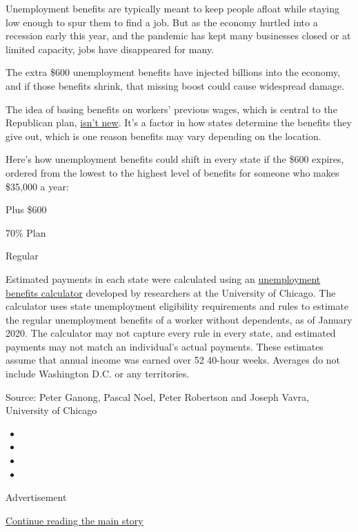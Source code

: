 Unemployment benefits are typically meant to keep people afloat while
staying low enough to spur them to find a job. But as the economy
hurtled into a recession early this year, and the pandemic has kept many
businesses closed or at limited capacity, jobs have disappeared for
many.

The extra \$600 unemployment benefits have injected billions into the
economy, and if those benefits shrink, that missing boost could cause
widespread damage.

The idea of basing benefits on workers' previous wages, which is central
to the Republican plan,
\href{https://www.nytimes3xbfgragh.onion/interactive/2020/04/23/business/economy/unemployment-benefits-stimulus-coronavirus.html}{isn't
new}. It's a factor in how states determine the benefits they give out,
which is one reason benefits may vary depending on the location.

Here's how unemployment benefits could shift in every state if the \$600
expires, ordered from the lowest to the highest level of benefits for
someone who makes \$35,000 a year:

Plus \$600

70\% Plan

Regular

Estimated payments in each state were calculated using an
\href{https://github.com/ganong-noel/ui_calculator}{unemployment
benefits calculator} developed by researchers at the University of
Chicago. The calculator uses state unemployment eligibility requirements
and rules to estimate the regular unemployment benefits of a worker
without dependents, as of January 2020. The calculator may not capture
every rule in every state, and estimated payments may not match an
individual's actual payments. These estimates assume that annual income
was earned over 52 40-hour weeks. Averages do not include Washington
D.C. or any territories.

Source: Peter Ganong, Pascal Noel, Peter Robertson and Joseph Vavra,
University of Chicago

\begin{itemize}
\item
\item
\item
\item
\end{itemize}

Advertisement

\protect\hyperlink{after-bottom}{Continue reading the main story}

